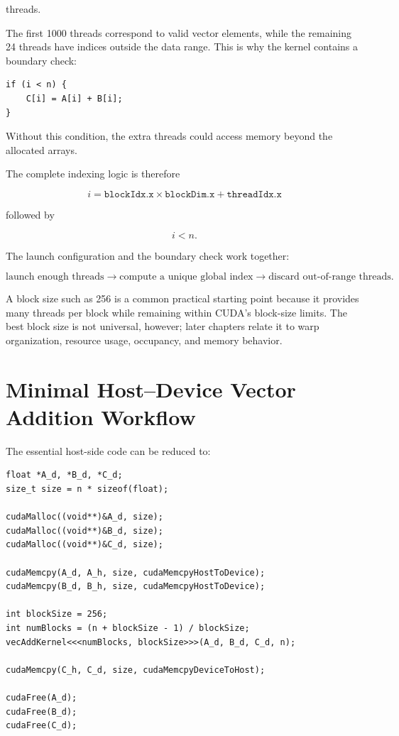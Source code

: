 \documentclass[11pt,a4paper]{article}
\begin{document}
threads.

The first 1000 threads correspond to valid vector elements, while the remaining 24 threads have indices outside the data range. This is why the kernel contains a boundary check:

\begin{lstlisting}
if (i < n) {
    C[i] = A[i] + B[i];
}
\end{lstlisting}

Without this condition, the extra threads could access memory beyond the allocated arrays.

The complete indexing logic is therefore

\[
\boxed{
i
=
\texttt{blockIdx.x}
\times
\texttt{blockDim.x}
+
\texttt{threadIdx.x}
}
\]

followed by

\[
\boxed{i<n}.
\]

The launch configuration and the boundary check work together:

\[
\text{launch enough threads}
\rightarrow
\text{compute a unique global index}
\rightarrow
\text{discard out-of-range threads}.
\]

A block size such as 256 is a common practical starting point because it provides many threads per block while remaining within CUDA's block-size limits. The best block size is not universal, however; later chapters relate it to warp organization, resource usage, occupancy, and memory behavior.

\section{Minimal Host--Device Vector Addition Workflow}

The essential host-side code can be reduced to:

\begin{lstlisting}
float *A_d, *B_d, *C_d;
size_t size = n * sizeof(float);

cudaMalloc((void**)&A_d, size);
cudaMalloc((void**)&B_d, size);
cudaMalloc((void**)&C_d, size);

cudaMemcpy(A_d, A_h, size, cudaMemcpyHostToDevice);
cudaMemcpy(B_d, B_h, size, cudaMemcpyHostToDevice);

int blockSize = 256;
int numBlocks = (n + blockSize - 1) / blockSize;
vecAddKernel<<<numBlocks, blockSize>>>(A_d, B_d, C_d, n);

cudaMemcpy(C_h, C_d, size, cudaMemcpyDeviceToHost);

cudaFree(A_d);
cudaFree(B_d);
cudaFree(C_d);
\end{lstlisting}
\end{document}
